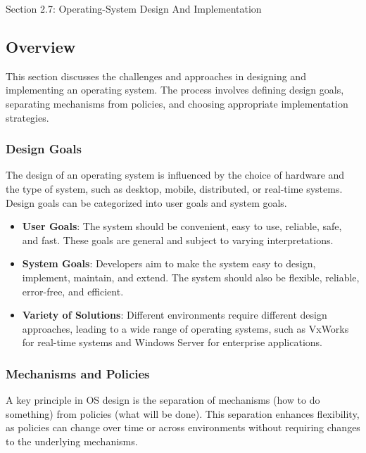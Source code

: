 \begin{notes}{Section 2.7: Operating-System Design And Implementation}
    \subsection*{Overview}

    This section discusses the challenges and approaches in designing and implementing an operating system. The process involves defining design goals, separating mechanisms from policies, and choosing 
    appropriate implementation strategies.
    
    \subsubsection*{Design Goals}
    
    The design of an operating system is influenced by the choice of hardware and the type of system, such as desktop, mobile, distributed, or real-time systems. Design goals can be categorized into 
    user goals and system goals.
    
    \begin{highlight}
    
    \begin{itemize}
        \item \textbf{User Goals}: The system should be convenient, easy to use, reliable, safe, and fast. These goals are general and subject to varying interpretations.
        \item \textbf{System Goals}: Developers aim to make the system easy to design, implement, maintain, and extend. The system should also be flexible, reliable, error-free, and efficient.
        \item \textbf{Variety of Solutions}: Different environments require different design approaches, leading to a wide range of operating systems, such as VxWorks for real-time systems and Windows 
        Server for enterprise applications.
    \end{itemize}
    
    \end{highlight}
    
    \subsubsection*{Mechanisms and Policies}
    
    A key principle in OS design is the separation of mechanisms (how to do something) from policies (what will be done). This separation enhances flexibility, as policies can change over time or across 
    environments without requiring changes to the underlying mechanisms.
    

\end{notes}

